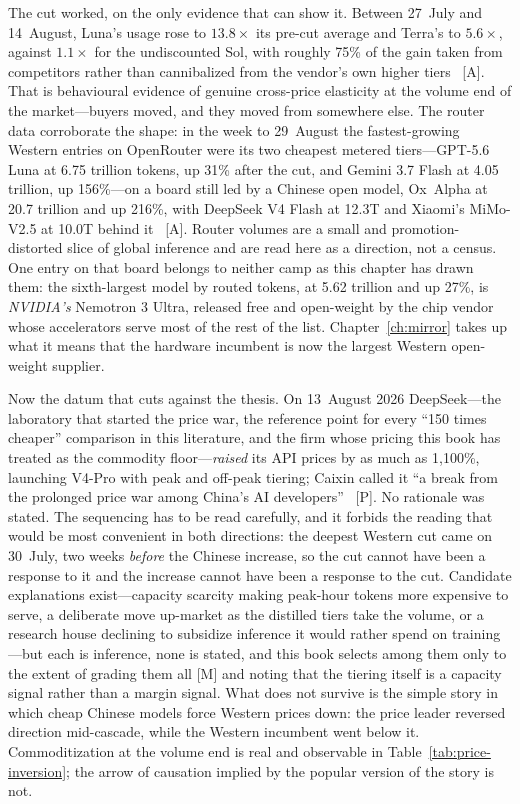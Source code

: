 The cut worked, on the only evidence that can show it. Between 27~July and 14~August, Luna's usage rose to $13.8\times$ its pre-cut average and Terra's to $5.6\times$, against $1.1\times$ for the undiscounted Sol, with roughly 75\% of the gain taken from competitors rather than cannibalized from the vendor's own higher tiers~\cite{price-inversion} [A]. That is behavioural evidence of genuine cross-price elasticity at the volume end of the market---buyers moved, and they moved from somewhere else. The router data corroborate the shape: in the week to 29~August the fastest-growing Western entries on OpenRouter were its two cheapest metered tiers---GPT-5.6 Luna at 6.75 trillion tokens, up 31\% after the cut, and Gemini 3.7 Flash at 4.05 trillion, up 156\%---on a board still led by a Chinese open model, Ox~Alpha at 20.7 trillion and up 216\%, with DeepSeek V4 Flash at 12.3T and Xiaomi's MiMo-V2.5 at 10.0T behind it~\cite{openrouter-aug26} [A]. Router volumes are a small and promotion-distorted slice of global inference and are read here as a direction, not a census. One entry on that board belongs to neither camp as this chapter has drawn them: the sixth-largest model by routed tokens, at 5.62 trillion and up 27\%, is \emph{NVIDIA's} Nemotron 3 Ultra, released free and open-weight by the chip vendor whose accelerators serve most of the rest of the list. Chapter~\ref{ch:mirror} takes up what it means that the hardware incumbent is now the largest Western open-weight supplier.

Now the datum that cuts against the thesis. On 13~August 2026 DeepSeek---the laboratory that started the price war, the reference point for every ``150 times cheaper'' comparison in this literature, and the firm whose pricing this book has treated as the commodity floor---\emph{raised} its API prices by as much as 1{,}100\%, launching V4-Pro with peak and off-peak tiering; Caixin called it ``a break from the prolonged price war among China's AI developers''~\cite{deepseek-raise} [P]. No rationale was stated. The sequencing has to be read carefully, and it forbids the reading that would be most convenient in both directions: the deepest Western cut came on 30~July, two weeks \emph{before} the Chinese increase, so the cut cannot have been a response to it and the increase cannot have been a response to the cut. Candidate explanations exist---capacity scarcity making peak-hour tokens more expensive to serve, a deliberate move up-market as the distilled tiers take the volume, or a research house declining to subsidize inference it would rather spend on training---but each is inference, none is stated, and this book selects among them only to the extent of grading them all [M] and noting that the tiering itself is a capacity signal rather than a margin signal. What does not survive is the simple story in which cheap Chinese models force Western prices down: the price leader reversed direction mid-cascade, while the Western incumbent went below it. Commoditization at the volume end is real and observable in Table~\ref{tab:price-inversion}; the arrow of causation implied by the popular version of the story is not.

